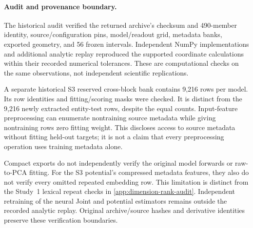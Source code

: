 \paragraph{Audit and provenance boundary.}
The historical audit verified the returned archive's
checksum and 490-member identity, source/configuration
pins, model/readout grid, metadata banks, exported geometry,
and 56 frozen intervals.
Independent NumPy implementations and additional analytic
replay reproduced the supported coordinate calculations
within their recorded numerical tolerances.
These are computational checks on the same observations,
not independent scientific replications.

A separate historical S3 reserved cross-block bank contains
9,216 rows per model.
Its row identities and fitting/scoring masks were checked.
It is distinct from the 9,216 newly extracted entity-test
rows, despite the equal counts.
Input-feature preprocessing can enumerate nontraining
source metadata while giving nontraining rows zero fitting
weight.
This discloses access to source metadata without fitting
held-out targets; it is not a claim that every preprocessing
operation uses training metadata alone.

Compact exports do not independently verify the original
model forwards or raw-to-PCA fitting.
For the S3 potential's compressed metadata features, they
also do not verify every omitted repeated embedding row.
This limitation is distinct from the Study~1 lexical
repeat checks in \cref{app:dimension-rank-audit}.
Independent retraining of the neural Joint and potential
estimators remains outside the recorded analytic replay.
Original archive/source hashes and derivative identities
preserve these verification boundaries.
